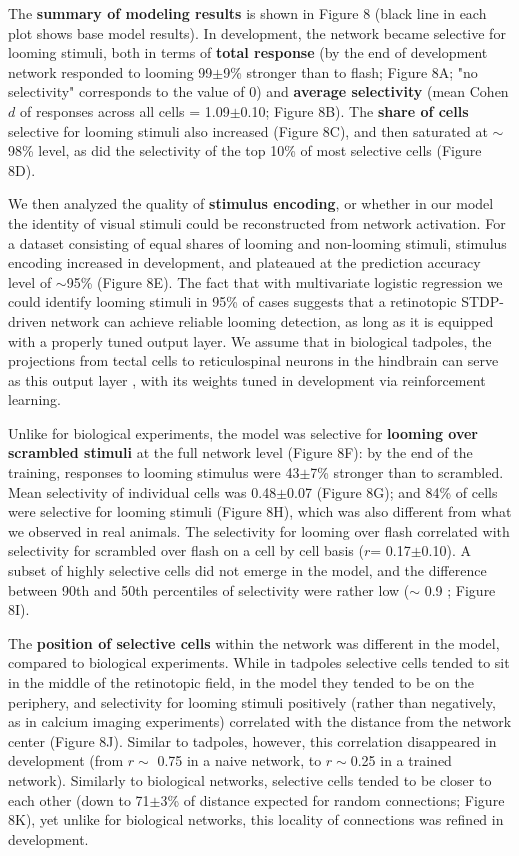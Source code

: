 \documentclass{article}
\begin{document}
The \textbf{summary of modeling results} is shown in Figure 8 (black line in each plot shows base model results). In development, the network became selective for looming stimuli, both in terms of \textbf{total response} (by the end of development network responded to looming 99$\pm$9\% stronger than to flash; Figure 8A; "no selectivity" corresponds to the value of 0) and \textbf{average selectivity} (mean Cohen $d$ of responses across all cells = 1.09$\pm$0.10; Figure 8B). The \textbf{share of cells} selective for looming stimuli also increased (Figure 8C), and then saturated at $\sim$98\% level, as did the selectivity of the top 10\% of most selective cells (Figure 8D).

We then analyzed the quality of \textbf{stimulus encoding}, or whether in our model the identity of visual stimuli could be reconstructed from network activation. For a dataset consisting of equal shares of looming and non-looming stimuli, stimulus encoding increased in development, and plateaued at the prediction accuracy level of $\sim$95\% (Figure 8E). The fact that with multivariate logistic regression we could identify looming stimuli in 95\% of cases suggests that a retinotopic STDP-driven network can achieve reliable looming detection, as long as it is equipped with a properly tuned output layer. We assume that in biological tadpoles, the projections from tectal cells to reticulospinal neurons in the hindbrain can serve as this output layer \citep{helmbrecht2018topography}, with its weights tuned in development via reinforcement learning.

Unlike for biological experiments, the model was selective for \textbf{looming over scrambled stimuli} at the full network level (Figure 8F): by the end of the training, responses to looming stimulus were 43$\pm$7\% stronger than to scrambled. Mean selectivity of individual cells was 0.48$\pm$0.07 (Figure 8G); and 84\% of cells were selective for looming stimuli (Figure 8H), which was also different from what we observed in real animals. The selectivity for looming over flash correlated with selectivity for scrambled over flash on a cell by cell basis ($r$= 0.17$\pm$0.10). A subset of highly selective cells did not emerge in the model, and the difference between 90th and 50th percentiles of selectivity were rather low ($\sim$ 0.9 ; Figure 8I).

The \textbf{position of selective cells} within the network was different in the model, compared to biological experiments. While in tadpoles selective cells tended to sit in the middle of the retinotopic field, in the model they tended to be on the periphery, and selectivity for looming stimuli positively (rather than negatively, as in calcium imaging experiments) correlated with the distance from the network center (Figure 8J). Similar to tadpoles, however, this correlation disappeared in development (from $r\sim$ 0.75 in a naive network, to $r\sim$0.25 in a trained network). Similarly to biological networks, selective cells tended to be closer to each other (down to 71$\pm$3\% of distance expected for random connections; Figure 8K), yet unlike for biological networks, this locality of connections was refined in development.
\end{document}
